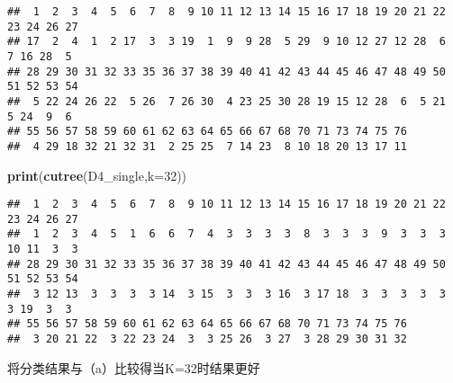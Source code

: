 \documentclass[
]{article}
\newenvironment{Shaded}{\begin{snugshade}}{\end{snugshade}}
\newcommand{\DataTypeTok}[1]{\textcolor[rgb]{0.13,0.29,0.53}{#1}}
\newcommand{\DecValTok}[1]{\textcolor[rgb]{0.00,0.00,0.81}{#1}}
\newcommand{\KeywordTok}[1]{\textcolor[rgb]{0.13,0.29,0.53}{\textbf{#1}}}
\newcommand{\NormalTok}[1]{#1}
\newcommand{\OperatorTok}[1]{\textcolor[rgb]{0.81,0.36,0.00}{\textbf{#1}}}
\begin{document}
\begin{Shaded}
\end{Shaded}

\begin{verbatim}
##  1  2  3  4  5  6  7  8  9 10 11 12 13 14 15 16 17 18 19 20 21 22 23 24 26 27 
## 17  2  4  1  2 17  3  3 19  1  9  9 28  5 29  9 10 12 27 12 28  6  7 16 28  5 
## 28 29 30 31 32 33 35 36 37 38 39 40 41 42 43 44 45 46 47 48 49 50 51 52 53 54 
##  5 22 24 26 22  5 26  7 26 30  4 23 25 30 28 19 15 12 28  6  5 21  5 24  9  6 
## 55 56 57 58 59 60 61 62 63 64 65 66 67 68 70 71 73 74 75 76 
##  4 29 18 32 21 32 31  2 25 25  7 14 23  8 10 18 20 13 17 11
\end{verbatim}

\begin{Shaded}
\begin{Highlighting}[]
\KeywordTok{print}\NormalTok{(}\KeywordTok{cutree}\NormalTok{(D4_single,}\DataTypeTok{k=}\DecValTok{32}\NormalTok{))}
\end{Highlighting}
\end{Shaded}

\begin{verbatim}
##  1  2  3  4  5  6  7  8  9 10 11 12 13 14 15 16 17 18 19 20 21 22 23 24 26 27 
##  1  2  3  4  5  1  6  6  7  4  3  3  3  3  8  3  3  3  9  3  3  3 10 11  3  3 
## 28 29 30 31 32 33 35 36 37 38 39 40 41 42 43 44 45 46 47 48 49 50 51 52 53 54 
##  3 12 13  3  3  3  3 14  3 15  3  3  3 16  3 17 18  3  3  3  3  3  3 19  3  3 
## 55 56 57 58 59 60 61 62 63 64 65 66 67 68 70 71 73 74 75 76 
##  3 20 21 22  3 22 23 24  3  3 25 26  3 27  3 28 29 30 31 32
\end{verbatim}

将分类结果与（a）比较得当K=32时结果更好
\end{document}
